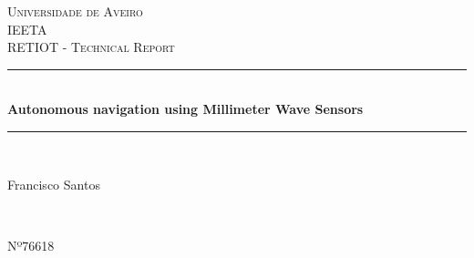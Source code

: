 \documentclass[12pt]{article}
\begin{document}
\begin{titlepage}


\newcommand{\HRule}{\rule{\linewidth}{0.5mm}} %

\center %
 

\textsc{\LARGE Universidade de Aveiro}\\[1.5cm] %
\textsc{\Large IEETA}\\[0.5cm] %
\textsc{\Large RETIOT - Technical Report}\\[0.5cm]


\HRule \\[0.4cm]
{ \huge \bfseries Autonomous navigation using Millimeter Wave Sensors}\\[0.4cm] %
\HRule \\[1.5cm]
 

\begin{minipage}{0.4\textwidth}
\begin{flushleft} \large
Francisco Santos %
\end{flushleft}
\end{minipage}
~
\begin{minipage}{0.4\textwidth}
\begin{flushright} \large
Nº76618\\
\end{flushright}
\end{minipage}\\[2cm]

\Large {}


\end{titlepage}
\end{document}
